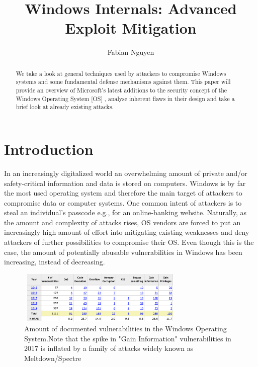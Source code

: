 \documentclass[10pt,twocolumn,a4paper]{article}
\author{Fabian Nguyen}
\begin{document}
\title{Windows Internals: Advanced Exploit Mitigation}

\newcommand{\todo}[1]{{\texttt{[#1]}}}
\newcommand{\code}[1]{{\tt \small{#1}}}

\maketitle


\begin{abstract}
We take a look at general techniques used by attackers to compromise Windows systems and some fundamental defense mechanisms against them.
This paper will provide an overview of Microsoft's latest additions to the security concept of the Windows Operating System [OS] , analyse inherent flaws in their design and take a brief look at already existing attacks. 
\end{abstract}

\section{Introduction}\label{sec:introduction}
In an increasingly digitalized world an overwhelming amount of private and/or safety-critical information and data is stored on computers.
Windows is by far the most used operating system and therefore the main target of attackers to compromise data or computer systems.
One common intent of attackers is to steal an individual's passcode e.g., for an online-banking website.
Naturally, as the amount and complexity of attacks rises, OS vendors are forced to put an increasingly high amount of effort into mitigating existing weaknesses and deny attackers of further possibilities to compromise their OS.
Even though this is the case, the amount of potentially abusable vulnerabilities in Windows has been increasing, instead of decreasing.

\begin{figure}[h]
\includegraphics[width=8cm, height=2.5cm]{fig/stats}
\caption{Amount of documented vulnerabilities in the Windows Operating System.\newline Note that the spike in "Gain Information" vulnerabilities in 2017 is inflated by a family of attacks widely known as Meltdown/Spectre \cite{CVE}}
\end{figure}
\end{document}
